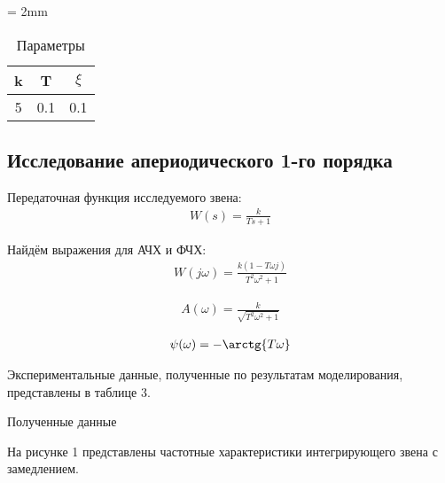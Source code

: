 \documentclass[a4paper, 12pt]{article}
\begin{document}
\begin{table}[h!]
    \tabulinesep = 2mm
    \centering
    \begin{threeparttable}
    	\caption{Параметры}\label{tab:perflogcross}
    	\begin{tabular}{|c|c|c|}
    		\hline
        	k & T & $\xi$ \\ \hline
        	5 & 0.1 & 0.1 \\
        	\hline
    	\end{tabular}
    \end{threeparttable} 
\end{table}

\newpage
\begin{center}
	\section{Исследование апериодического 1-го порядка}
\end{center}

\par 
Передаточная функция исследуемого звена:
\begin{align}
	W(s)=\frac{k}{Ts+1}
\end{align}
\par 
Найдём выражения для АЧХ и ФЧХ:
\begin{align}
W(j\omega) = \frac{k(1-T\omega j)}{T^2\omega^2 + 1}
\end{align}

\begin{align}
	A(\omega) = \frac{k}{\sqrt{T^2\omega^2 + 1}}
\end{align}
	
\begin{align}
	\psi(\omega) =-\arctg{T\omega}
\end{align}

\par 
Экспериментальные данные, полученные по результатам моделирования, представлены в таблице 3.
\begin{table}[h!]
    \centering
    \begin{threeparttable}
        \caption{Полученные данные} \label{tab:perflogcross}
    \end{threeparttable}
\end{table}

\newpage
\par 
На рисунке 1 представлены частотные характеристики интегрирующего звена с замедлением.
\end{document}
